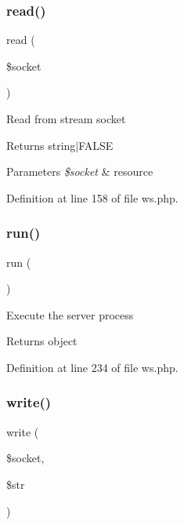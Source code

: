 \hypertarget{class_c_l_i_1_1_w_s_a845d775219b4327eb7cb626ffb1c2af3}{}\label{class_c_l_i_1_1_w_s_a845d775219b4327eb7cb626ffb1c2af3} 
\subsubsection{\texorpdfstring{read()}{read()}}
{\footnotesize\ttfamily read (\begin{DoxyParamCaption}\item[{}]{\$socket }\end{DoxyParamCaption})}

Read from stream socket \begin{DoxyReturn}{Returns}
string$\vert$\+F\+A\+L\+SE 
\end{DoxyReturn}

\begin{DoxyParams}{Parameters}
{\em \$socket} & resource \\
\hline
\end{DoxyParams}


Definition at line 158 of file ws.\+php.

\hypertarget{class_c_l_i_1_1_w_s_afb0fafe7e02a3ae1993c01c19fad2bae}{}\label{class_c_l_i_1_1_w_s_afb0fafe7e02a3ae1993c01c19fad2bae} 
\subsubsection{\texorpdfstring{run()}{run()}}
{\footnotesize\ttfamily run (\begin{DoxyParamCaption}{ }\end{DoxyParamCaption})}

Execute the server process \begin{DoxyReturn}{Returns}
object 
\end{DoxyReturn}


Definition at line 234 of file ws.\+php.

\hypertarget{class_c_l_i_1_1_w_s_ac95ce2fb30c44bae1927b0107756f7e3}{}\label{class_c_l_i_1_1_w_s_ac95ce2fb30c44bae1927b0107756f7e3} 
\subsubsection{\texorpdfstring{write()}{write()}}
{\footnotesize\ttfamily write (\begin{DoxyParamCaption}\item[{}]{\$socket,  }\item[{}]{\$str }\end{DoxyParamCaption})}

